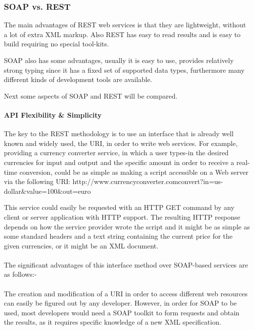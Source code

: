 \subsubsection{SOAP vs. REST\label{sec:back_soap_vs_rest}}

The main advantages of \ac{REST} web services is that they are lightweight, without a lot of extra \ac{XML} markup. Also \ac{REST} has easy to read results and is easy to build requiring no special tool-kits.

\ac{SOAP} also has some advantages, usually it is easy to use, provides relatively strong typing since it has a fixed set of supported data types, furthermore many different kinds of development tools are available.

Next some aspects of \ac{SOAP} and \ac{REST} will be compared.

\paragraph{API Flexibility \& Simplicity}

The key to the \ac{REST} methodology is to use an interface that is already well known and widely used, the \ac{URI}, in order to write web services. For example, providing a currency converter service, in which a user types-in the desired currencies for input and output and the specific amount in order to receive a real-time conversion, could be as simple as making a script accessible on a Web server via the following \ac{URI}: http://www.currencyconverter.com\/convert?in=us-dollar\&value=100\&out=euro

This service could easily be requested with an \ac{HTTP} GET command by any client or server application with \ac{HTTP} support. The resulting \ac{HTTP} response depends on how the service provider wrote the script and it might be as simple as some standard headers and a text string containing the current price for the given currencies, or it might be an \ac{XML} document.
\\
\\
The significant advantages of this interface method over \ac{SOAP}-based services are as follows:-
\\
\\
The creation and modification of a \ac{URI} in order to access different web resources can easily be figured out by any developer. However, in order for \ac{SOAP} to be used, most developers would need a \ac{SOAP} toolkit to form requests and obtain the results, as it requires specific knowledge of a new \ac{XML} specification.
\\
\\
